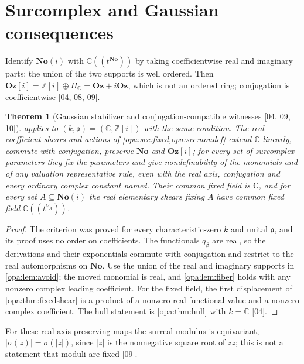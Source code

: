 \documentclass[11pt,oneside]{article}
\numberwithin{equation}{section}
\newtheorem{theorem}{Theorem}[section]
\theoremstyle{definition}
\theoremstyle{remark}
\newcommand{\No}{\mathbf{No}}
\newcommand{\Oz}{\mathbf{Oz}}
\newcommand{\Og}{\mathbf{Oz}[i]}
\newcommand{\SC}{\mathbf{No}(i)}
\newcommand{\C}{\mathbb C}
\newcommand{\Z}{\mathbb Z}
\newcommand{\oo}{\mathfrak o}
\newcommand{\Hahn}[2]{#1((t^{#2}))}
\newcommand{\src}[1]{\textup{\textsf{\small[#1]}}}
\begin{document}
\section{Surcomplex and Gaussian consequences}\label{opa:sec:complex}

Identify $\SC$ with $\Hahn\C\No$ by taking coefficientwise real and imaginary
parts; the union of the two supports is well ordered. Then
$\Og=\Z[i]\oplus\Pi_\C=\Oz+i\Oz$, which is not an ordered ring; conjugation is
coefficientwise \src{04, 08, 09}.

\begin{theorem}[Gaussian stabilizer and conjugation-compatible witnesses \src{04, 09, 10}]\label{opa:thm:complex}
 applies to $(k,\oo)=(\C,\Z[i])$ with the same condition.
The real-coefficient shears and actions of \cref{opa:sec:fixed,opa:sec:nondef} extend
$\C$-linearly, commute with conjugation, preserve $\No$ and $\Og$; for every set of
surcomplex parameters they fix the parameters and give nondefinability of the
monomials and of any valuation representative rule, even with the real axis,
conjugation and every ordinary complex constant named. Their common fixed field
is $\C$, and for every set $A\subseteq\SC$ the real elementary shears fixing $A$ have
common fixed field $\Hahn\C{V_A}$.
\end{theorem}
\begin{proof}
The criterion was proved for every characteristic-zero $k$ and unital $\oo$, and its
proof uses no order on coefficients. The functionals $q_\beta$ are real, so the
derivations and their exponentials commute with conjugation and restrict to the
real automorphisms on $\No$. Use the union of the real and imaginary supports in
\cref{opa:lem:avoid}; the moved monomial is real, and \cref{opa:lem:fiber} holds with
any nonzero complex leading coefficient. For the fixed field, the first
displacement of \cref{opa:thm:fixedshear} is a product of a nonzero real functional
value and a nonzero complex coefficient. The hull statement is \cref{opa:thm:hull}
with $k=\C$ \src{04}.
\end{proof}

For these real-axis-preserving maps the surreal modulus is equivariant,
$|\sigma(z)|=\sigma(|z|)$, since $|z|$ is the nonnegative square root of $z\overline z$;
this is not a statement that moduli are fixed \src{09}.
\end{document}
